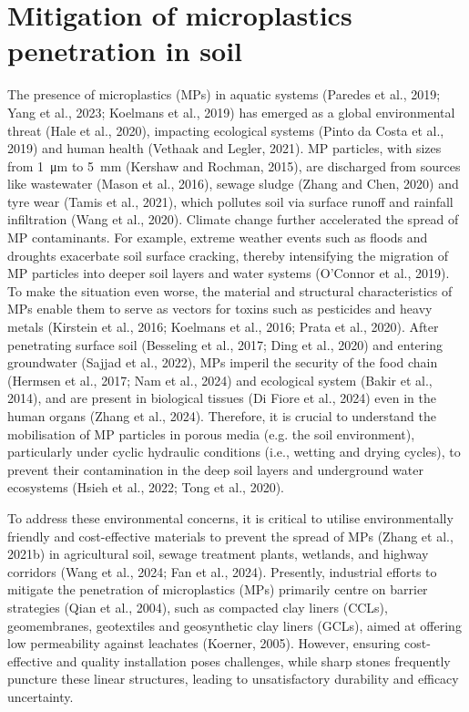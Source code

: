 \section{Mitigation of microplastics penetration in soil}
The presence of microplastics (MPs) in aquatic systems (Paredes et al., 2019; Yang et al., 2023; Koelmans et al., 2019) has emerged as a global environmental threat (Hale et al., 2020), impacting ecological systems (Pinto da Costa et al., 2019) and human health (Vethaak and Legler, 2021). MP particles, with sizes from \qty{1}{\micro\meter} to \qty{5}{\milli\meter} (Kershaw and Rochman, 2015), are discharged from sources like wastewater (Mason et al., 2016), sewage sludge (Zhang and Chen, 2020) and tyre wear (Tamis et al., 2021), which pollutes soil via surface runoff and rainfall infiltration (Wang et al., 2020). Climate change further accelerated the spread of MP contaminants. For example, extreme weather events such as floods and droughts exacerbate soil surface cracking, thereby intensifying the migration of MP particles into deeper soil layers and water systems (O’Connor et al., 2019). To make the situation even worse, the material and structural characteristics of MPs enable them to serve as vectors for toxins such as pesticides and heavy metals (Kirstein et al., 2016; Koelmans et al., 2016; Prata et al., 2020). After penetrating surface soil (Besseling et al., 2017; Ding et al., 2020) and entering groundwater (Sajjad et al., 2022), MPs imperil the security of the food chain (Hermsen et al., 2017; Nam et al., 2024) and ecological system (Bakir et al., 2014), and are present in biological tissues (Di Fiore et al., 2024) even in the human organs (Zhang et al., 2024). Therefore, it is crucial to understand the mobilisation of MP particles in porous media (e.g. the soil environment), particularly under cyclic hydraulic conditions (i.e., wetting and drying cycles), to prevent their contamination in the deep soil layers and underground water ecosystems (Hsieh et al., 2022; Tong et al., 2020). \par
To address these environmental concerns, it is critical to utilise environmentally friendly and cost-effective materials to prevent the spread of MPs (Zhang et al., 2021b) in agricultural soil, sewage treatment plants, wetlands, and highway corridors (Wang et al., 2024; Fan et al., 2024). Presently, industrial efforts to mitigate the penetration of microplastics (MPs) primarily centre on barrier strategies (Qian et al., 2004), such as compacted clay liners (CCLs), geomembranes, geotextiles and geosynthetic clay liners (GCLs), aimed at offering low permeability against leachates (Koerner, 2005). However, ensuring cost-effective and quality installation poses challenges, while sharp stones frequently puncture these linear structures, leading to unsatisfactory durability and efficacy uncertainty. \par
